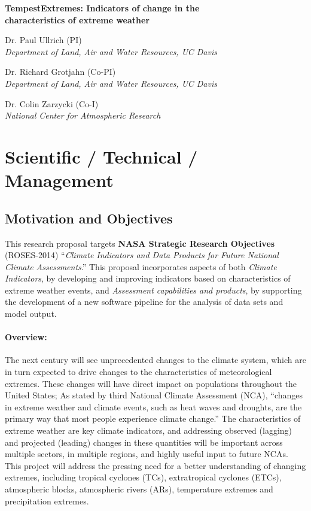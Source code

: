 \documentclass[11pt]{article}
\begin{document}

\begin{center}
{\large \textbf{TempestExtremes: Indicators of change in the \\ characteristics of extreme weather}}

Dr. Paul Ullrich (PI) \\
\textit{Department of Land, Air and Water Resources, UC Davis}

Dr. Richard Grotjahn (Co-PI) \\
\textit{Department of Land, Air and Water Resources, UC Davis}

Dr. Colin Zarzycki (Co-I) \\
\textit{National Center for Atmospheric Research}
\end{center}

\begin{spacing}{-1.0}
\tableofcontents
\end{spacing}

\clearpage

\setcounter{page}{1}

\section{Scientific / Technical / Management}

\subsection{Motivation and Objectives}

This research proposal targets \textbf{NASA Strategic Research Objectives} (ROSES-2014) ``\textit{Climate Indicators and Data Products for Future National Climate Assessments}.''  This proposal incorporates aspects of both \textit{Climate Indicators}, by developing and improving indicators based on characteristics of extreme weather events, and \textit{Assessment capabilities and products}, by supporting the development of a new software pipeline for the analysis of data sets and model output.

\paragraph{Overview:}  The next century will see unprecedented changes to the climate system, which are in turn expected to drive changes to the characteristics of meteorological extremes. These changes will have direct impact on populations throughout the United States{\color{blue};} As stated by third National Climate Assessment (NCA), ``changes in extreme weather and climate events, such as heat waves and droughts, are the primary way that most people experience climate change.'' The characteristics of extreme weather are key climate indicators, and addressing observed (lagging) and projected (leading) changes in these quantities will be important across multiple sectors, in multiple regions, and highly useful input to future NCAs.  This project will address the pressing need for a better understanding of changing extremes, including tropical cyclones (TCs), extratropical cyclones (ETCs), atmospheric blocks, atmospheric rivers (ARs), temperature extremes and precipitation extremes. 
\end{document}
